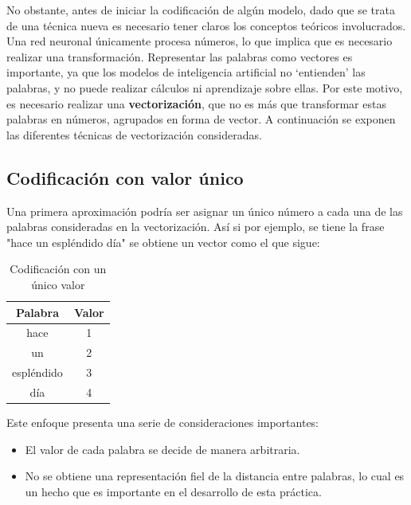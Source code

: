 \documentclass[12pt,a4paper, xcolor=table]{article}
\begin{document}
\vspace{3mm}

No obstante, antes de iniciar la codificación de algún modelo, dado que se trata de una técnica nueva es necesario tener claros los conceptos teóricos involucrados. Una red neuronal únicamente procesa números, lo que implica que es necesario realizar una transformación. Representar las palabras como vectores es importante, ya que los modelos de inteligencia artificial no ‘entienden’ las palabras, y no puede realizar cálculos ni aprendizaje sobre ellas. Por este motivo, es necesario realizar una \textbf{vectorización}, que no es más que transformar estas palabras en números, agrupados en forma de vector. A continuación se exponen las diferentes técnicas de vectorización consideradas.

\subsection{Codificación con valor único}
Una primera aproximación podría ser asignar un único número a cada una de las palabras consideradas en la vectorización. Así si por ejemplo, se tiene la frase "hace un espléndido día" se obtiene un vector como el que sigue:

      \begin{table}[h]
        \centering
        \begin{tabular}{|c|c|}
        \hline
        \rowcolor[HTML]{DAE8FC}
        \textbf{Palabra} & \textbf{Valor} \\ \hline
        hace                    & 1   \\ \hline
        un                     & 2   \\ \hline
        espléndido                     & 3  \\ \hline
        día                       & 4   \\ \hline
        \end{tabular}
        \caption{Codificación con un único valor}
            \label{fig:graf_exp1}
    \end{table}

Este enfoque presenta una serie de consideraciones importantes:
\begin{itemize}
\item El valor de cada palabra se decide de manera arbitraria.
\item No se obtiene una representación fiel de la distancia entre palabras, lo cual es un hecho que es importante en el desarrollo de esta práctica.
\end{itemize}
\end{document}
